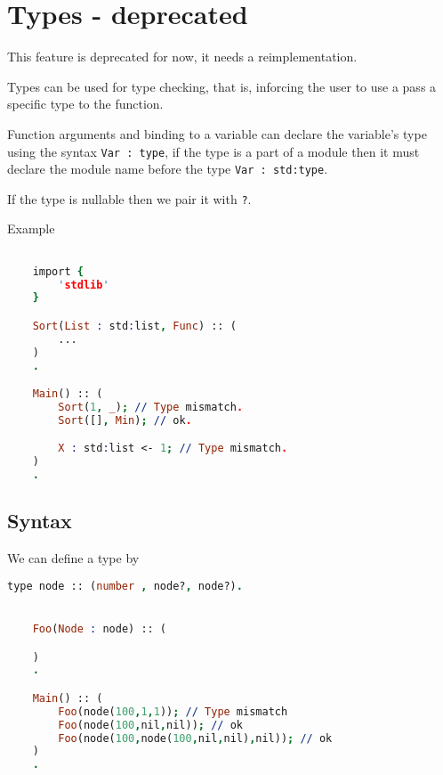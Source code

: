 \section{Types - deprecated}

\begin{note}
    This feature is deprecated for now, it needs a reimplementation.
\end{note}

Types can be used for type checking, that is, inforcing the user
to use a pass a specific type to the function.

Function arguments and binding to a variable can declare the variable's type 
using the syntax \texttt{Var : type}, if the type is a part of a module
then it must declare the module name before the type \texttt{Var : std:type}.

If the type is nullable then we pair it with \texttt{?}.

Example

\begin{lstlisting}[language = Prolog]

    import {
        'stdlib'
    }

    Sort(List : std:list, Func) :: (
        ...
    )
    .

    Main() :: (
        Sort(1, _); // Type mismatch.
        Sort([], Min); // ok.

        X : std:list <- 1; // Type mismatch.
    )
    .

\end{lstlisting}

\subsection{Syntax}

We can define a type by 

\begin{lstlisting}[language = Prolog]
    type node :: (number , node?, node?).


    Foo(Node : node) :: (

    )
    .

    Main() :: (
        Foo(node(100,1,1)); // Type mismatch
        Foo(node(100,nil,nil)); // ok
        Foo(node(100,node(100,nil,nil),nil)); // ok
    )
    .

\end{lstlisting}


